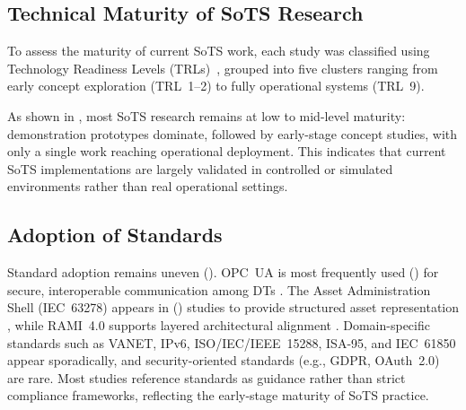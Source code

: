 \subsection{Technical Maturity of SoTS Research}
\label{subsec:literature-review-results-trl}

To assess the maturity of current SoTS work, each study was classified using 
Technology Readiness Levels (TRLs)~\cite{mankins2009technology}, grouped into 
five clusters ranging from early concept exploration (TRL~1–2) to fully 
operational systems (TRL~9).



As shown in , most SoTS research remains at low to mid-level maturity: demonstration prototypes dominate, followed by early-stage concept studies, with only a single work reaching operational deployment. This indicates that current SoTS implementations are largely validated in controlled or simulated environments rather than real operational settings.


\subsection{Adoption of Standards}\label{subsec:literature-review-results-standards}


Standard adoption remains uneven (). OPC~UA is most frequently used () for secure, interoperable communication among DTs \cite{dobie2024network, joseph2021aggregated}. The Asset Administration Shell (IEC~63278) appears in () studies to provide structured asset representation \cite{gill2022method, gollner2022collaborative}, while RAMI~4.0 supports layered architectural alignment \cite{binder2021utilizing}. Domain-specific standards such as VANET, IPv6, ISO/IEC/IEEE~15288, ISA-95, and IEC~61850 appear sporadically, and security-oriented standards (e.g., GDPR, OAuth~2.0) are rare. Most studies reference standards as guidance rather than strict compliance frameworks, reflecting the early-stage maturity of SoTS practice.




